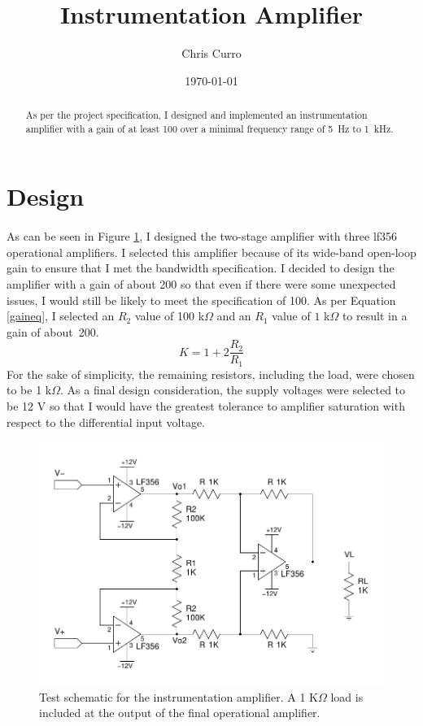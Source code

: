 \documentclass[justified,nobib]{tufte-handout}
\title{Instrumentation Amplifier}
\author{Chris Curro}
\date{\today}
\begin{document}
\maketitle
\begin{abstract}
As per the project specification, I designed and implemented an instrumentation
amplifier with a gain of at least 100 over a minimal frequency range of 5~Hz to 
1~kHz. 
\end{abstract}
\section{Design}
\paragraph{}
As can be seen in Figure \ref{schem}, I designed the two-stage amplifier with
three {\sc lf}356 operational amplifiers. I selected this amplifier because of
its wide-band open-loop gain \cite{lf356} to ensure that I met the bandwidth
specification. I decided to design the amplifier with a gain of about 200 so
that even if there were some unexpected issues, I would still be likely to
meet the specification of 100. As per Equation \ref{gaineq}, I selected an $R_2$
value of 100 k$\Omega$ and an $R_1$ value of $1$ k$\Omega$ to result in a gain
of about~200.
\begin{equation}
\label{gaineq}
K = 1 + 2\frac{R_2}{R_1}
\end{equation}
For the sake of simplicity, the remaining resistors, including the load,
were chosen to be 1 k$\Omega$. As a final design consideration, the supply
voltages were selected to be 12 V so that I would have the greatest tolerance to
amplifier saturation with respect to the differential input voltage.
\begin{figure}
\centering
\label{schem}
\includegraphics[width=0.9\linewidth,trim=0 .28in 0 .3in,clip=true]{schem.pdf}
\caption{Test schematic for the instrumentation amplifier. A 1 K$\Omega$ load
is included at the output of the final operational amplifier.} 
\end{figure}
\end{document}
